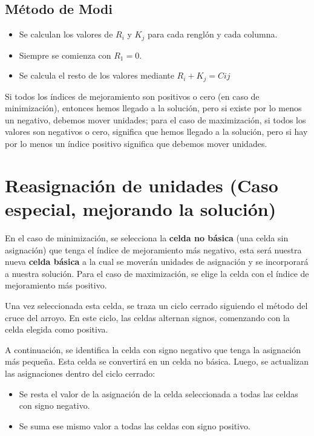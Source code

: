 	\subsection{Método de Modi}
	
	\begin{itemize}
		\item Se calculan los valores de $R_{i}$ y $K_{j}$ para cada renglón y cada columna.
		\item Siempre se comienza con $R_ {1}=0$.
		\item Se calcula el resto de los valores mediante $R_{i}+K_{j}=C{ij}$
	\end{itemize}
	
	Si todos los índices de mejoramiento son positivos o cero (en caso de minimización), entonces hemos llegado a la solución, pero si existe por lo menos un negativo, debemos mover unidades; para el caso de maximización, si todos los valores son negativos o cero, significa que hemos llegado a la solución, pero si hay por lo menos un índice positivo significa que debemos mover unidades.
	
	\section{Reasignación de unidades \small{(Caso especial, mejorando la solución)}}
	
	En el caso de minimización, se selecciona la \textbf{celda no básica} (una celda sin asignación) que tenga el índice de mejoramiento más negativo, esta será nuestra nueva \textbf{celda básica} a la cual se moverán unidades de asignación y se incorporará a nuestra solución. Para el caso de maximización, se elige la celda con el índice de mejoramiento más positivo.
	
	Una vez seleccionada esta celda, se traza un ciclo cerrado siguiendo el método del cruce del arroyo. En este ciclo, las celdas alternan signos, comenzando con la celda elegida como positiva.
	
	A continuación, se identifica la celda con signo negativo que tenga la asignación más pequeña. Esta celda se convertirá en un celda no básica. Luego, se actualizan las asignaciones dentro del ciclo cerrado:
	
	\begin{itemize}
		\item Se resta el valor de la asignación de la celda seleccionada a todas las celdas con signo negativo.
		\item Se suma ese mismo valor a todas las celdas con signo positivo.	
	\end{itemize}
	
